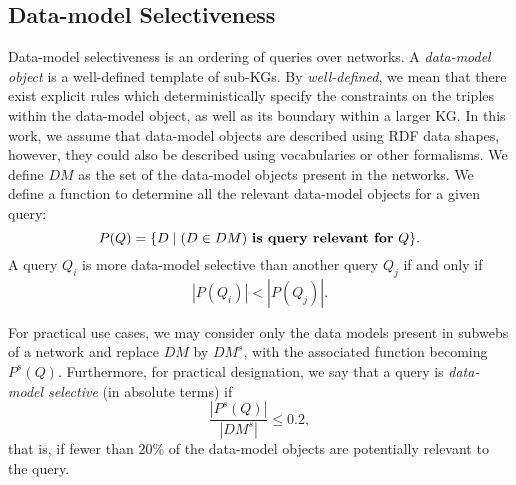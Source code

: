 \subsection{Data-model Selectiveness}
Data-model selectiveness is an ordering of queries over networks. 
A \emph{data-model object} is a well-defined template of sub-KGs. 
By \emph{well-defined}, we mean that there exist explicit rules which deterministically specify the constraints on the triples within the data-model object, as well as its boundary within a larger KG.  
In this work, we assume that data-model objects are described using RDF data shapes, however, they could also be described using vocabularies or other formalisms.
We define $DM$ as the set of the data-model objects present in the networks.
We define a function to determine all the relevant data-model objects for a given query:
\begin{equation}
   P(Q) = \{ D \mid (D \in DM) \text{ \textbf{is query relevant for} } Q \}.
\end{equation}
A query $Q_i$ is more data-model selective than another query $Q_j$ if and only if 
\begin{equation}
    \left| P(Q_i) \right| < \left| P(Q_j) \right|.
\end{equation}

For practical use cases, we may consider only the data models present in subwebs of a network and replace $DM$ by $DM^s$,
with the associated function becoming $P^s(Q)$.
Furthermore, for practical designation, we say that a query is \emph{data-model selective} (in absolute terms) if 
\begin{equation}
    \frac{\left| P^s(Q) \right|}{\left| DM^s \right|} \leq 0.2,
\end{equation}
that is, if fewer than 20\% of the data-model objects are potentially relevant to the query.